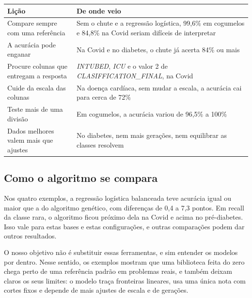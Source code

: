 \documentclass[11pt,a4paper]{article}
\newenvironment{tabela}{\par\nopagebreak[4]\vspace{0.3em}\nopagebreak[4]\begingroup\centering\small}{\par\endgroup\vspace{0.6em}}
\begin{document}
\begin{tabela}
\begin{tabularx}{\linewidth}{lL}
\toprule
Lição & De onde veio\\
\midrule
Compare sempre com uma referência & Sem o chute e a regressão logística, 99,6\% em cogumelos e 84,8\% na Covid seriam difíceis de interpretar\\
A acurácia pode enganar & Na Covid e no diabetes, o chute já acerta 84\% ou mais\\
Procure colunas que entregam a resposta & \emph{INTUBED}, \emph{ICU} e o valor 2 de \emph{CLASIFFICATION\_FINAL}, na Covid\\
Cuide da escala das colunas & Na doença cardíaca, sem mudar a escala, a acurácia cai para cerca de 72\%\\
Teste mais de uma divisão & Em cogumelos, a acurácia variou de 96,5\% a 100\%\\
Dados melhores valem mais que ajustes & No diabetes, nem mais gerações, nem equilibrar as classes resolvem\\
\bottomrule
\end{tabularx}
\end{tabela}

\subsection{Como o algoritmo se compara}

Nos quatro exemplos, a regressão logística balanceada teve acurácia igual ou maior que a do algoritmo genético, com diferenças de 0,4 a 7,3 pontos. Em recall da classe rara, o algoritmo ficou próximo dela na Covid e acima no pré-diabetes. Isso vale para estas bases e estas configurações, e outras comparações podem dar outros resultados.

O nosso objetivo não é substituir essas ferramentas, e sim entender os modelos por dentro. Nesse sentido, os exemplos mostram que uma biblioteca feita do zero chega perto de uma referência padrão em problemas reais, e também deixam claros os seus limites: o modelo traça fronteiras lineares, usa uma única nota com cortes fixos e depende de mais ajustes de escala e de gerações.
\end{document}
